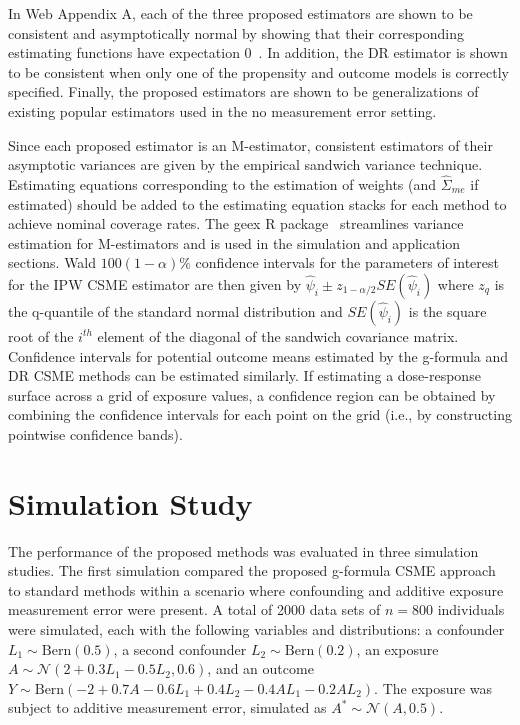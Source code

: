 \documentclass[useAMS,usenatbib,referee]{biom}
\begin{document}
In Web Appendix A, each of the three proposed estimators are shown to be consistent and asymptotically normal by showing that their corresponding estimating functions have expectation 0~\citep{stefanski2002}. In addition, the DR estimator is shown to be consistent when only one of the propensity and outcome models is correctly specified. Finally, the proposed estimators are shown to be generalizations of existing popular estimators used in the no measurement error setting.

Since each proposed estimator is an M-estimator, consistent estimators of their asymptotic variances are given by the empirical sandwich variance technique. Estimating equations corresponding to the estimation of weights (and $\hat{\Sigma}_{me}$ if estimated) should be added to the estimating equation stacks for each method to achieve nominal coverage rates. The geex R package~\citep{saul2017} streamlines variance estimation for M-estimators and is used in the simulation and application sections. Wald $100(1-\alpha)\%$ confidence intervals for the parameters of interest for the IPW CSME estimator are then given by $\hat{\psi}_{i} \pm z_{1-\alpha/2} SE(\hat{\psi}_{i})$ where $z_q$ is the q-quantile of the standard normal distribution and $SE(\hat{\psi}_{i})$ is the square root of the $i^{th}$ element of the diagonal of the sandwich covariance matrix. Confidence intervals for potential outcome means estimated by the g-formula and DR CSME methods can be estimated similarly. If estimating a dose-response surface across a grid of exposure values, a confidence region can be obtained by combining the confidence intervals for each point on the grid (i.e., by constructing pointwise confidence bands).

\section{Simulation Study}

The performance of the proposed methods was evaluated in three simulation studies. The first simulation compared the proposed g-formula CSME approach to standard methods within a scenario where confounding and additive exposure measurement error were present. A total of 2000 data sets of $n = 800$ individuals were simulated, each with the following variables and distributions: a confounder $L_{1} \sim \text{Bern}(0.5)$, a second confounder $L_{2} \sim \text{Bern}(0.2)$, an exposure $A \sim \mathcal{N}(2 + 0.3L_{1} - 0.5L_{2}, 0.6)$, and an outcome $Y \sim \text{Bern}(-2 + 0.7A - 0.6L_{1} + 0.4L_{2} - 0.4AL_{1} - 0.2AL_{2})$. The exposure was subject to additive measurement error, simulated as $A^{*} \sim \mathcal{N}(A, 0.5)$.
\end{document}
